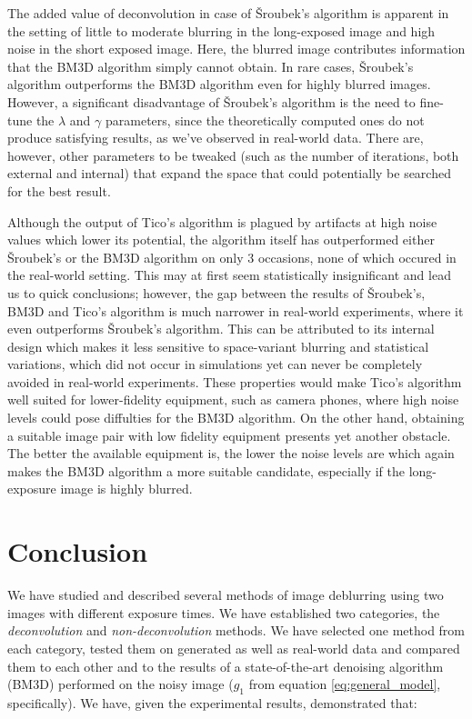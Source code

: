 \documentclass[12pt,notitlepage]{report}
\begin{document}
\clearpage

The added value of deconvolution in case of Šroubek's algorithm is apparent in the setting of little to moderate blurring in the long-exposed image and high noise in the short exposed image. Here, the blurred image contributes information that the BM3D algorithm simply cannot obtain. In rare cases, Šroubek's algorithm outperforms the BM3D algorithm even for highly blurred images. However, a significant disadvantage of Šroubek's algorithm is the need to fine-tune the $\lambda$ and $\gamma$ parameters, since the theoretically computed ones do not produce satisfying results, as we've observed in real-world data. There are, however, other parameters to be tweaked (such as the number of iterations, both external and internal) that expand the space that could potentially be searched for the best result. 


Although the output of Tico's algorithm is plagued by artifacts at high noise values which lower its potential, the algorithm itself has outperformed either Šroubek's or the BM3D algorithm on only 3 occasions, none of which occured in the real-world setting. This may at first seem statistically insignificant and lead us to quick conclusions; however, the gap between the results of Šroubek's, BM3D and Tico's algorithm is much narrower in real-world experiments, where it even outperforms Šroubek's algorithm. This can be attributed to its internal design which makes it less sensitive to space-variant blurring and statistical variations, which did not occur in simulations yet can never be completely avoided in real-world experiments. These properties would make Tico's algorithm well suited for lower-fidelity equipment, such as camera phones, where high noise levels could pose diffulties for the BM3D algorithm. On the other hand, obtaining a suitable image pair with low fidelity equipment presents yet another obstacle. The better the available equipment is, the lower the noise levels are which again makes the BM3D algorithm a more suitable candidate, especially if the long-exposure image is highly blurred.              


\chapter{Conclusion}

We have studied and described several methods of image deblurring using two images with different exposure times. We have established two categories, the {\em deconvolution} and {\em non-deconvolution} methods.  We have selected one method from each category, tested them on generated as well as real-world data and compared them to each other and to the results of a state-of-the-art denoising algorithm (BM3D) performed on the noisy image ($g_1$ from equation \ref{eq:general_model}, specifically). We have, given the experimental results, demonstrated that: 
\end{document}
